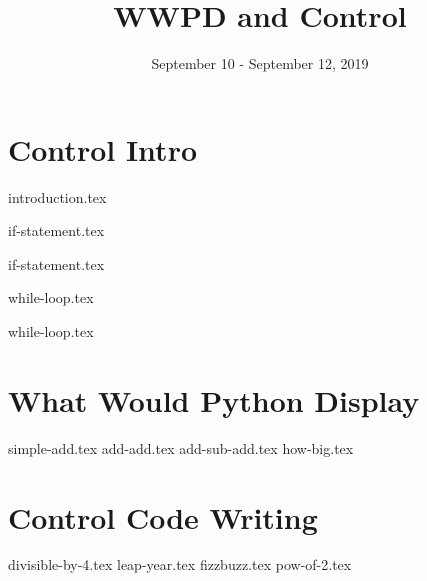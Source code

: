 \documentclass{exam}
\title{WWPD and Control}
\date{September 10 - September 12, 2019}
\begin{document}
\maketitle
\section{Control Intro}
{introduction.tex}

{if-statement.tex}

{if-statement.tex}

{while-loop.tex}

{while-loop.tex}


\section{What Would Python Display}
\begin{questions}
{simple-add.tex}
{add-add.tex}
{add-sub-add.tex}
{how-big.tex}

\end{questions}

\section{Control Code Writing}
\begin{questions}
{divisible-by-4.tex}
{leap-year.tex}
{fizzbuzz.tex}
{pow-of-2.tex}
\end{questions}
\end{document}
